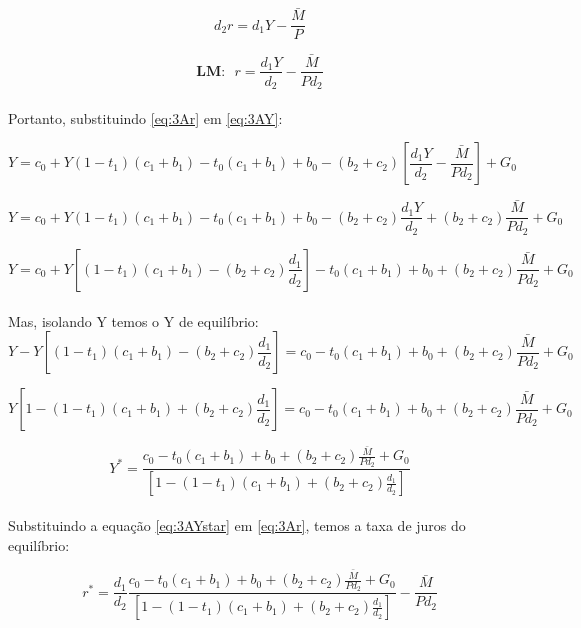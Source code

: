 \documentclass{article}
\begin{document}
\begin{equation}
d_2r = d_1Y - \frac{\bar{M}}{P}
\end{equation}

\begin{equation}\label{eq:3Ar}
\textbf{LM:} \>\>\> r = \frac{d_1Y}{d_2} - \frac{\bar{M}}{Pd_2}
\end{equation}
\\
Portanto, substituindo \eqref{eq:3Ar} em \eqref{eq:3AY}:

\begin{equation}
Y = c_0 + Y(1-t_1)(c_1+b_1)-t_0(c_1+b_1) + b_0 - (b_2 +c_2)\left[ \frac{d_1Y}{d_2} - \frac{\bar{M}}{Pd_2}\right] + G_0
\end{equation}

\begin{equation}
Y = c_0 + Y(1-t_1)(c_1+b_1)-t_0(c_1+b_1) + b_0 - (b_2 +c_2) \frac{d_1Y}{d_2} + (b_2 +c_2)\frac{\bar{M}}{Pd_2} + G_0
\end{equation}

\begin{equation}
Y = c_0 + Y\left[(1-t_1)(c_1+b_1)-(b_2 +c_2) \frac{d_1}{d_2} \right]-t_0(c_1+b_1) + b_0 + (b_2 +c_2)\frac{\bar{M}}{Pd_2} + G_0
\end{equation}
\\
Mas, isolando Y temos o Y de equilíbrio:
\begin{equation}
Y - Y\left[(1-t_1)(c_1+b_1)-(b_2 +c_2) \frac{d_1}{d_2} \right] = c_0 -t_0(c_1+b_1) + b_0 + (b_2 +c_2)\frac{\bar{M}}{Pd_2} + G_0
\end{equation}

\begin{equation}
Y\left[1-(1-t_1)(c_1+b_1)+(b_2 +c_2) \frac{d_1}{d_2} \right] = c_0 -t_0(c_1+b_1) + b_0 + (b_2 +c_2)\frac{\bar{M}}{Pd_2} + G_0
\end{equation}

\begin{equation}\label{eq:3AYstar}
Y^{*} = \frac{c_0 -t_0(c_1+b_1) + b_0 + (b_2 +c_2)\frac{\bar{M}}{Pd_2} + G_0}{\left[1-(1-t_1)(c_1+b_1)+(b_2 +c_2) \frac{d_1}{d_2} \right]}
\end{equation}
\\
Substituindo a equação \eqref{eq:3AYstar} em \eqref{eq:3Ar}, temos a taxa de juros do equilíbrio:

\begin{equation}\label{eq:3Arstar}
r^{*} = \frac{d_1}{d_2} \frac{c_0 -t_0(c_1+b_1) + b_0 + (b_2 +c_2)\frac{\bar{M}}{Pd_2} + G_0}{\left[1-(1-t_1)(c_1+b_1)+(b_2 +c_2) \frac{d_1}{d_2} \right]} - \frac{\bar{M}}{Pd_2}
\end{equation}
\end{document}
